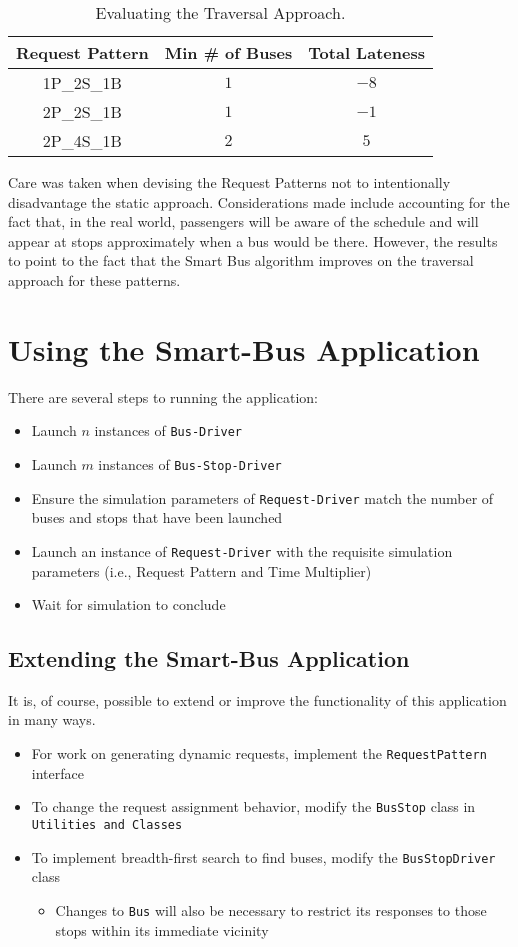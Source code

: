 \documentclass[runningheads]{llncs}
\begin{document}
\setlength{\tabcolsep}{1em}
\begin{table}[htbp]
\centering
\caption{Evaluating the Traversal Approach.}
\begin{tabular}{c c c}
Request Pattern & Min \# of Buses & Total Lateness \\ \hline
1P\_2S\_1B & $1$ & $-8$ \\
2P\_2S\_1B & $1$ & $-1$ \\
2P\_4S\_1B & $2$ & $5$ \\
\hline
\end{tabular}
\label{tbl:traversal}
\end{table}

Care was taken when devising the Request Patterns not to intentionally disadvantage the static approach. Considerations made include accounting for the fact that, in the real world, passengers will be aware of the schedule and will appear at stops approximately when a bus would be there. However, the results to point to the fact that the Smart Bus algorithm improves on the traversal approach for these patterns.

\section{Using the Smart-Bus Application}
There are several steps to running the application:
\begin{itemize}
	\item Launch $n$ instances of \lstinline{Bus-Driver}
	\item Launch $m$ instances of \lstinline{Bus-Stop-Driver}
	\item Ensure the simulation parameters of \lstinline{Request-Driver} match the number of buses and stops that have been launched
	\item Launch an instance of \lstinline{Request-Driver} with the requisite simulation parameters (i.e., Request Pattern and Time Multiplier)
	\item Wait for simulation to conclude
\end{itemize} 

\subsection{Extending the Smart-Bus Application}
It is, of course, possible to extend or improve the functionality of this application in many ways.
\begin{itemize}
	\item For work on generating dynamic requests, implement the \lstinline{RequestPattern} interface 
	\item To change the request assignment behavior, modify the \lstinline{BusStop} class in \lstinline{Utilities and Classes}
	\item To implement breadth-first search to find buses, modify the \lstinline{BusStopDriver} class
	\begin{itemize}
		\item Changes to \lstinline{Bus} will also be necessary to restrict its responses to those stops within its immediate vicinity
	\end{itemize}
\end{itemize}
\end{document}
